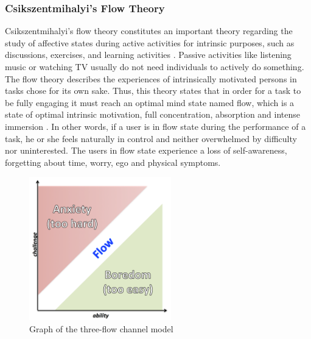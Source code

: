 \subsubsection{Csikszentmihalyi's Flow Theory}
\label{subsubsec:flow-theory}

Csikszentmihalyi's flow theory constitutes an important theory regarding the study of affective states during active activities for intrinsic purposes, such as discussions, exercises, and learning activities \cite{SnyderLopezPedrotti2010, Csikszentmihalyi2014}. Passive activities like listening music or watching TV usually do not need individuals to actively do something. The flow theory describes the experiences of intrinsically motivated persons in tasks chose for its own sake. Thus, this theory states that in order for a task to be fully engaging it must reach an optimal mind state named flow, which is a state of optimal intrinsic motivation, full concentration, absorption and intense immersion \cite{Wu2011, Xu2011}. In other words, if a user is in flow state during the performance of a task, he or she feels naturally in control and neither overwhelmed by difficulty nor uninterested. The users in flow state experience a loss of self-awareness, forgetting about time, worry, ego and physical symptoms.

\begin{figure}[htb]
 \caption{Graph of the three-flow channel model}
 \label{fig:flow-channel}
 \centering
 \includegraphics[width=0.55\textwidth]{images/chap-general-background/flow-channel.png}
\end{figure}

